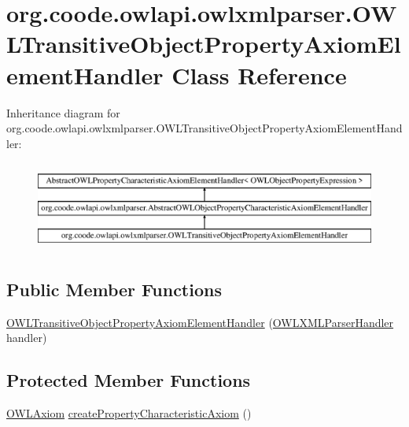 \hypertarget{classorg_1_1coode_1_1owlapi_1_1owlxmlparser_1_1_o_w_l_transitive_object_property_axiom_element_handler}{\section{org.\-coode.\-owlapi.\-owlxmlparser.\-O\-W\-L\-Transitive\-Object\-Property\-Axiom\-Element\-Handler Class Reference}
\label{classorg_1_1coode_1_1owlapi_1_1owlxmlparser_1_1_o_w_l_transitive_object_property_axiom_element_handler}
}
Inheritance diagram for org.\-coode.\-owlapi.\-owlxmlparser.\-O\-W\-L\-Transitive\-Object\-Property\-Axiom\-Element\-Handler\-:\begin{figure}[H]
\begin{center}
\leavevmode
\includegraphics[height=2.984014cm]{classorg_1_1coode_1_1owlapi_1_1owlxmlparser_1_1_o_w_l_transitive_object_property_axiom_element_handler}
\end{center}
\end{figure}
\subsection*{Public Member Functions}
\begin{DoxyCompactItemize}
\item 
\hyperlink{classorg_1_1coode_1_1owlapi_1_1owlxmlparser_1_1_o_w_l_transitive_object_property_axiom_element_handler_a1185effbf1acdb2225ea4330a0ad3d47}{O\-W\-L\-Transitive\-Object\-Property\-Axiom\-Element\-Handler} (\hyperlink{classorg_1_1coode_1_1owlapi_1_1owlxmlparser_1_1_o_w_l_x_m_l_parser_handler}{O\-W\-L\-X\-M\-L\-Parser\-Handler} handler)
\end{DoxyCompactItemize}
\subsection*{Protected Member Functions}
\begin{DoxyCompactItemize}
\item 
\hyperlink{interfaceorg_1_1semanticweb_1_1owlapi_1_1model_1_1_o_w_l_axiom}{O\-W\-L\-Axiom} \hyperlink{classorg_1_1coode_1_1owlapi_1_1owlxmlparser_1_1_o_w_l_transitive_object_property_axiom_element_handler_a76edcea0c2520c447278f3a8e88590c4}{create\-Property\-Characteristic\-Axiom} ()
\end{DoxyCompactItemize}


